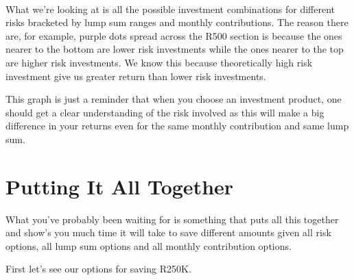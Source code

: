 \documentclass[11pt]{article}
\begin{document}
    \begin{center}
    \end{center}
    { \hspace*{\fill} \\}
    
    What we're looking at is all the possible investment combinations for
different risks bracketed by lump sum ranges and monthly contributions.
The reason there are, for example, purple dots spread across the R500
section is because the ones nearer to the bottom are lower risk
investments while the ones nearer to the top are higher risk
investments. We know this because theoretically high risk investment
give us greater return than lower risk investments.

This graph is just a reminder that when you choose an investment
product, one should get a clear understanding of the risk involved as
this will make a big difference in your returns even for the same
monthly contribution and same lump sum.

    \hypertarget{putting-it-all-together}{%
\section{Putting It All Together}\label{putting-it-all-together}}

    What you've probably been waiting for is something that puts all this
together and show's you much time it will take to save different amounts
given all risk options, all lump sum options and all monthly
contribution options.

First let's see our options for saving R250K.
\end{document}
